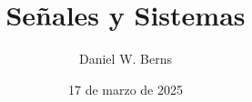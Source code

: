 \documentclass[a4paper,12pt]{report}
\begin{document}
\author{Daniel W. Berns}
\title{Se\~{n}ales y Sistemas}
\date{17 de marzo de 2025}

\maketitle
\tableofcontents


























\end{document}
